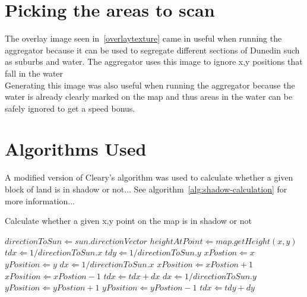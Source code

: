 \documentclass[12pt]{report}
\begin{document}
\section{Picking the areas to scan}
The overlay image seen in~\ref{overlaytexture} came in useful when running the aggregator because it can be used to segregate different sections of Dunedin such as suburbs and water. The aggregator uses this image to ignore x,y positions that fall in the water \\

Generating this image was also useful when running the aggregator because the water is already clearly marked on the map and thus areas in the water can be safely ignored to get a speed bonus. \\



\section{Algorithms Used}
A modified version of Cleary's algorithm was used to calculate whether a given block of land is in shadow or not... See algorithm~\ref{alg:shadow-calculation} for more information... 



\begin{algorithm}[h]
\caption{Calculate whether a given x,y point on the map is in shadow or not}
\label{alg:shadow-calculation}%
\begin{algorithmic}           %
\STATE $directionToSun \Leftarrow sun.directionVector$
\STATE $heightAtPoint \Leftarrow map.getHeight(x,y)$
\STATE $tdx \Leftarrow 1 / directionToSun.x$
\STATE $tdy \Leftarrow 1 / directionToSun.y$
\STATE $xPostion \Leftarrow x$
\STATE $yPosition \Leftarrow y$
	\ENDIF
		\STATE $dx \Leftarrow 1 / directionToSun.x$
			\STATE $xPosition \Leftarrow xPostion + 1$	
		\ELSE
			\STATE $xPosition \Leftarrow xPostion - 1$	
		\ENDIF
		\STATE $tdx \Leftarrow tdx + dx$
	\ELSE
		\STATE $dx \Leftarrow 1 / directionToSun.y$
			\STATE $yPosition \Leftarrow yPostion + 1$	
		\ELSE
			\STATE $yPosition \Leftarrow yPostion - 1$	
		\ENDIF
		\STATE $tdx \Leftarrow tdy + dy$		
	\ENDIF
\ENDWHILE
{}
\end{algorithmic}
\end{algorithm}
\end{document}
